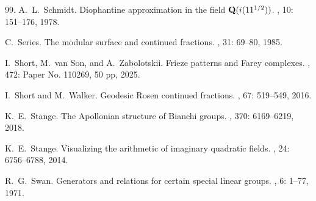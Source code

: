 \documentclass[graybox]{svmult}
\begin{document}
\begin{thebibliography}{99.}
A.~L.~Schmidt.
\newblock Diophantine approximation in the field {${\bf Q}(i(11^{1/2}))$}.
, 10: 151--176, 1978.

C.~Series.
\newblock The modular surface and continued fractions.
, 31: 69--80, 1985.

I.~Short, M.~van Son, and A.~Zabolotskii. 
\newblock  Frieze patterns and Farey complexes. 
, 472: Paper No. 110269, 50 pp, 2025. 

I.~Short and M.~Walker.
\newblock Geodesic Rosen continued fractions. 
, 67: 519--549, 2016. 

K.~E.~Stange.
\newblock The {A}pollonian structure of {B}ianchi groups.
, 370: 6169--6219, 2018.

K.~E.~Stange.
\newblock Visualizing the arithmetic of imaginary quadratic fields.
, 24: 6756--6788, 2014.

R.~G.~Swan.
\newblock Generators and relations for certain special linear groups.
, 6: 1--77, 1971.
\end{thebibliography}
\end{document}
